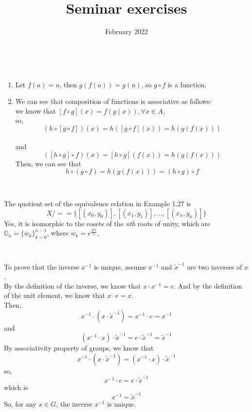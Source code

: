 \documentclass{article}
\title{Seminar exercises}
\author{ }
\date{February 2022}
\theoremstyle{definition}
\newenvironment{solution}[1]
{\renewcommand\theinnersolution{#1}\innersolution}
{\endinnersolution}
\begin{document}
\maketitle

\begin{solution}{1.9}\
	\begin{enumerate}[1.]
		\item Let $f(a) = u$, then $g(f(a)) = g(u)$, so $g \circ f$ is a function.
		\item We can see that composition of functions is associative as follows:\\
			we know that $[ f \circ g](x) = f(g(x)), \forall x \in A$,\\
			so,
			$$(h \circ [g \circ f])(x) = h([g \circ f](x)) = h(g(f(x)))$$
			\\
			and
			$$([h \circ g] \circ f)(x) = [h \circ g](f(x)) = h(g(f(x)))$$
			Then, we can see that $$h \circ (g \circ f) = h(g(f(x))) = (h \circ g) \circ f$$
	\end{enumerate}
\end{solution}

\begin{solution}{1.28}\

	The quotient set of the equivalence relation in Example 1.27 is
	$$
	X / \sim = \{[(x_0,y_0)], [(x_1, y_1)], \ldots, [(x_n, y_n)]\}
	$$
	Yes, it is isomorphic to the cosets of the \emph{nth} roots of unity, which are $\mathbb{G}_n = \{w_k\}^{n-1}_{k=0}$, where $w_k=e^{\frac{2 \pi i}{n}}$.
\end{solution}

\begin{solution}{2.2}\

	To prove that the inverse $x^{-1}$ is unique, assume $x^{-1}$ and $\tilde{x}^{-1}$ are two inverses of $x$.\\
	By the definition of the inverse, we know that $x \cdot x^{-1} = e$. And by the definition of the unit element, we know that $x \cdot e = x$.\\
	Then, $$x^{-1} \cdot (x \cdot \tilde{x}^{-1}) = x^{-1} \cdot e = x^{-1}$$
	and $$(x^{-1} \cdot x) \cdot \tilde{x}^{-1} = e \cdot \tilde{x}^{-1} = \tilde{x}^{-1}$$
	By associativity property of groups, we know that
	$$x^{-1} \cdot (x \cdot \tilde{x}^{-1}) = (x^{-1} \cdot x) \cdot \tilde{x}^{-1}$$
	so, $$x^{-1} \cdot e = e \cdot \tilde{x}^{-1}$$
	which is $$x^{-1} = \tilde{x}^{-1}$$
	So, for any $x \in G$, the inverse $x^{-1}$ is unique.
\end{solution}
\end{document}
